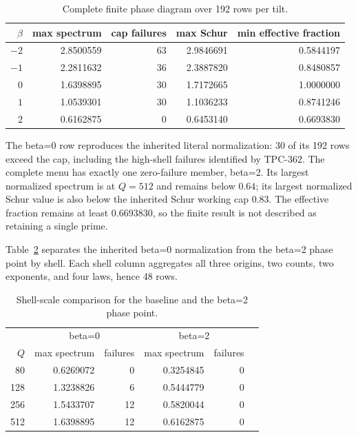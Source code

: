 \documentclass[10pt]{article}
\begin{document}
\begin{table}[t]
\centering
\caption{Complete finite phase diagram over 192 rows per tilt.}
\label{tab:phase}
\small
\begin{tabular}{r r r r r}
\toprule
$\beta$ & max spectrum & cap failures & max Schur & min effective fraction\\
\midrule
$-2$ & 2.8500559 & 63 & 2.9846691 & 0.5844197\\
$-1$ & 2.2811632 & 36 & 2.3887820 & 0.8480857\\
$0$  & 1.6398895 & 30 & 1.7172665 & 1.0000000\\
$1$  & 1.0539301 & 30 & 1.1036233 & 0.8741246\\
$2$  & 0.6162875 & 0 & 0.6453140 & 0.6693830\\
\bottomrule
\end{tabular}
\end{table}

The beta=0 row reproduces the inherited literal normalization: 30 of its 192
rows exceed the cap, including the high-shell failures identified by TPC-362.
The complete menu has exactly one zero-failure member, beta=2.  Its largest
normalized spectrum is at $Q=512$ and remains below $0.64$; its largest
normalized Schur value is also below the inherited Schur working cap $0.83$.
The effective fraction remains at least $0.6693830$, so the finite result is
not described as retaining a single prime.

Table~\ref{tab:q} separates the inherited beta=0 normalization from the
beta=2 phase point by shell.  Each shell column aggregates all three origins,
two counts, two exponents, and four laws, hence 48 rows.

\begin{table}[t]
\centering
\caption{Shell-scale comparison for the baseline and the beta=2 phase point.}
\label{tab:q}
\small
\begin{tabular}{r r r r r r}
\toprule
 & \multicolumn{2}{c}{beta=0} & \multicolumn{2}{c}{beta=2}\\
$Q$ & max spectrum & failures & max spectrum & failures\\
\midrule
80  & 0.6269072 & 0  & 0.3254845 & 0\\
128 & 1.3238826 & 6  & 0.5444779 & 0\\
256 & 1.5433707 & 12 & 0.5820044 & 0\\
512 & 1.6398895 & 12 & 0.6162875 & 0\\
\bottomrule
\end{tabular}
\end{table}
\end{document}
